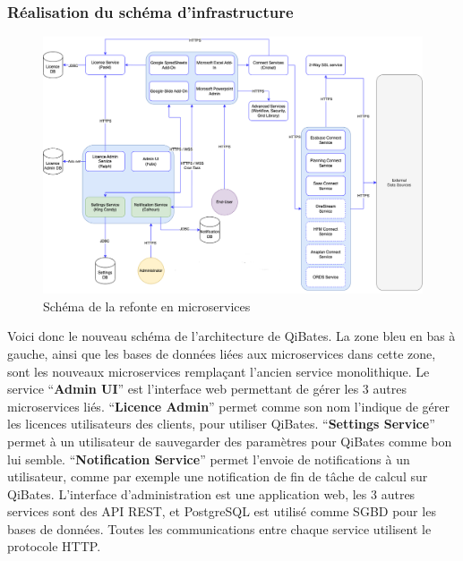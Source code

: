 \documentclass[a4paper, 11pt]{report}
\begin{document}
\subsubsection{Réalisation du schéma d'infrastructure}
  \begin{figure}[H]
      \centering
      \includegraphics[scale=0.40,center]{schemas/schema-qibates-v2.png}
      \caption{Schéma de la refonte en microservices}
  \end{figure}
Voici donc le nouveau schéma de l'architecture de QiBates. La zone bleu
en bas à gauche, ainsi que les bases de données liées aux microservices
dans cette zone, sont les nouveaux microservices remplaçant l'ancien
service monolithique.
\newline
Le service ``\textbf{Admin UI}'' est l'interface web permettant de gérer
les 3 autres microservices liés.
\newline
``\textbf{Licence Admin}'' permet comme son nom l'indique de gérer les
licences utilisateurs des clients, pour utiliser QiBates.
\newline
``\textbf{Settings Service}'' permet à un utilisateur de sauvegarder des
paramètres pour QiBates comme bon lui semble.
\newline
``\textbf{Notification Service}'' permet l'envoie de notifications à un
utilisateur, comme par exemple une notification de fin de tâche de
calcul sur QiBates.
\newline
\newline
L'interface d'administration est une application web, les 3 autres services sont des API REST,
et PostgreSQL est utilisé comme SGBD pour les bases de données.
Toutes les communications entre chaque service utilisent le protocole HTTP.
\end{document}
